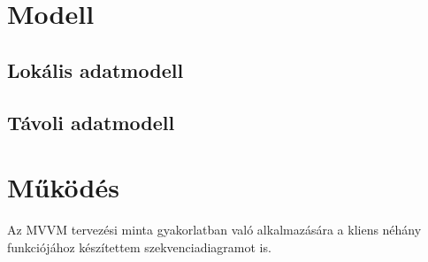 \section{Modell}

\subsection{Lokális adatmodell}

\subsection{Távoli adatmodell}

\section{Működés}

Az MVVM tervezési minta gyakorlatban való alkalmazására a kliens néhány funkciójához készítettem szekvenciadiagramot is.
